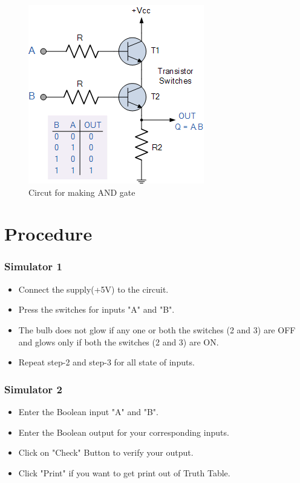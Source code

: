 	\begin{figure}[h]
		\centering
		\includegraphics{img/exp1/3}
		\caption{Circut for making AND gate}
		\label{fig:and_diag}
	\end{figure}
	
	

		
\section{Procedure}
	\subsubsection{Simulator 1}
	\begin{itemize}
		\tightlist
		\item Connect the supply(+5V) to the circuit.
		\item Press the switches for inputs "A" and "B".
		\item The bulb does not glow if any one or both the switches (2 and 3) are OFF and glows only if both the switches (2 and 3) are ON.
		\item Repeat step-2 and step-3 for all state of inputs.
	\end{itemize}

	\subsubsection{Simulator 2}
	\begin{itemize}
		\tightlist
		\item Enter the Boolean input "A" and "B".
		\item Enter the Boolean output for your corresponding inputs.
		\item Click on "Check" Button to verify your output.
		\item Click "Print" if you want to get print out of Truth Table.
	\end{itemize}


